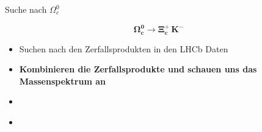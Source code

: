 \begin{frame}{Suche nach $\Omega_c^0$}

  \begin{center} \vspace{-1cm}
 \Large    \[\mathbf{\Omega_c^0 \rightarrow \Xi_c^+ \, K^-}\]
 \end{center}
   \begin{spacing}{1.5}
       
  
    \begin{itemize}    \item[\ding{202}] Suchen nach den Zerfallsprodukten in den LHCb Daten 
    \item[\ding{203}]\textbf {Kombinieren die Zerfallsprodukte und schauen uns das Massenspektrum an   }
        \item[]  \textcolor{white}{Wir filtern Daten}
    \item [] \textcolor{white}{Finden wir einen Peak, haben wir eine neues Teilchen entdeckt! }
\end{itemize}
 \end{spacing}

\end{frame}

